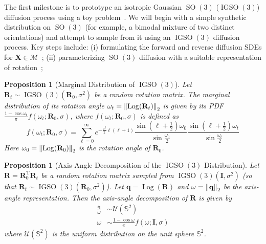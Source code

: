 \documentclass{article}
\theoremstyle{plain}
\newtheorem{proposition}[theorem]{Proposition}
\theoremstyle{definition}
\theoremstyle{remark}
\DeclareMathOperator{\SO}{SO}
\DeclareMathOperator{\IGSO}{IGSO}
\DeclareMathOperator{\Log}{\operatorname{Log}}
\begin{document}
The first milestone is to prototype an isotropic Gaussian $\SO(3)$ ($\IGSO(3)$) diffusion process using a toy problem~\cite{so3_diffusion}. We will begin with a simple synthetic distribution on $\SO(3)$ (for example, a bimodal mixture of two distinct orientations) and attempt to sample from it using an $\IGSO(3)$ diffusion process. Key steps include:
(i) formulating the forward and reverse diffusion SDEs for $\mathbf{X} \in \mathcal{M}$~\cite{riemannian_diffusion};
(ii) parameterizing $\SO(3)$ diffusion with a suitable representation of rotation~\cite{micro_lie_theory};

\begin{proposition}[Marginal Distribution of $\IGSO(3)$]\label{prop:marginal_igso3}
    Let $\mathbf{R}_t \sim \IGSO(3)(\mathbf{R}_0, \sigma^2)$ be a random rotation matrix. The marginal distribution of its rotation angle $\omega_t = \norm{\Log(\mathbf{R}_t)}_2$ is given by its PDF $\frac{1-\cos\omega_t}{\pi}f(\omega_t; \mathbf{R}_0, \sigma)$, where $f(\omega_t; \mathbf{R}_0, \sigma)$ is defined as
    \begin{equation}
        f(\omega_t; \mathbf{R}_0, \sigma) = \sum_{\ell=0}^{\infty} e^{-\frac{\sigma^2}{2}\ell(\ell+1)}\frac{\sin\left(\ell+\frac{1}{2}\right)\omega_0}{\sin \frac{\omega_0}{2}}\frac{\sin\left(\ell+\frac{1}{2}\right)\omega_t}{\sin \frac{\omega_t}{2}}
    \end{equation}
    Here $\omega_0 = \norm{\Log(\mathbf{R}_0)}_2$ is the rotation angle of $\mathbf{R}_0$.
\end{proposition}

\begin{proposition}[Axis-Angle Decomposition of the $\IGSO(3)$ Distribution]\label{prop:axis_angle_decomposition}
    Let $\mathbf{R} = \mathbf{R}_0^\mathrm{T}\mathbf{R}_t$ be a random rotation matrix sampled from $\IGSO(3)(\mathbf{I}, \sigma^2)$ (so that $\mathbf{R}_{t} \sim \IGSO(3)(\mathbf{R}_0, \sigma^2)$). Let $\mathbf{q} = \Log(\mathbf{R})$ and $\omega = \norm{\mathbf{q}}_2$ be the axis-angle representation. Then the axis-angle decomposition of $\mathbf{R}$ is given by
    \begin{align}
        \frac{\mathbf{q}}{\omega} & \sim \mathcal{U}(\mathbb{S}^2)                             \\
        \omega                    & \sim \frac{1-\cos\omega}{\pi}f(\omega; \mathbf{I}, \sigma)
    \end{align}
    where $\mathcal{U}(\mathbb{S}^2)$ is the uniform distribution on the unit sphere $\mathbb{S}^2$.
\end{proposition}
\end{document}
